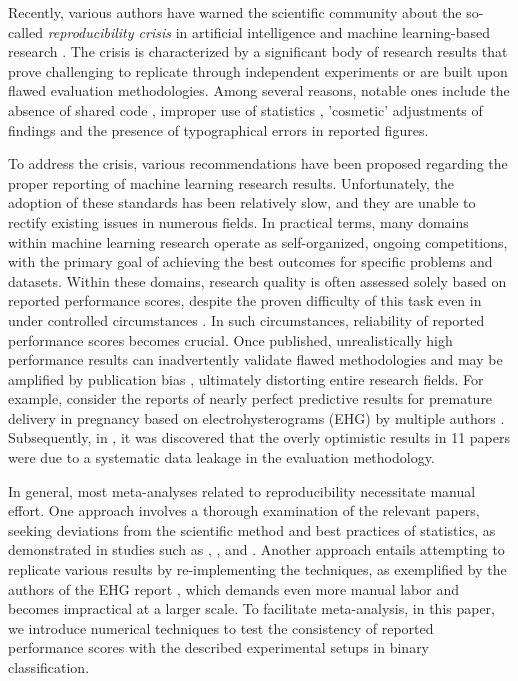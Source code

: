 \documentclass[5p, final]{elsarticle}
\begin{document}
Recently, various authors have warned the scientific community about the so-called \emph{reproducibility crisis} in artificial intelligence and machine learning-based research \cite{leakage, reprcrisis, repr0, repr1}. The crisis is characterized by a significant body of research results that prove challenging to replicate through independent experiments or are built upon flawed evaluation methodologies. Among several reasons, notable ones include the absence of shared code \cite{leakage}, improper use of statistics \cite{leakage, staterrors}, 'cosmetic' adjustments of findings \cite{fabrication} and the presence of typographical errors in reported figures.

To address the crisis, various recommendations have been proposed \cite{repr0, repr2} regarding the proper reporting of machine learning research results. Unfortunately, the adoption of these standards has been relatively slow, and they are unable to rectify existing issues in numerous fields.
In practical terms, many domains within machine learning research operate as self-organized, ongoing competitions, with the primary goal of achieving the best outcomes for specific problems and datasets. Within these domains, research quality is often assessed solely based on reported performance scores, despite the proven difficulty of this task even in under controlled circumstances \cite{ranking}. In such circumstances, reliability of reported performance scores becomes crucial. Once published, unrealistically high performance results can inadvertently validate flawed methodologies and may be amplified by publication bias \cite{publicationbias}, ultimately distorting entire research fields.
For example, consider the reports of nearly perfect predictive results for premature delivery in pregnancy based on electrohysterograms (EHG) by multiple authors \cite{ehgreview}. Subsequently, in \cite{ehg}, it was discovered that the overly optimistic results in 11 papers were due to a systematic data leakage in the evaluation methodology.

In general, most meta-analyses \cite{metaresearch} related to reproducibility necessitate manual effort. One approach involves a thorough examination of the relevant papers, seeking deviations from the scientific method and best practices of statistics, as demonstrated in studies such as \cite{psychiatry}, \cite{csecurity}, and \cite{satellite}. Another approach entails attempting to replicate various results by re-implementing the techniques, as exemplified by the authors of the EHG report \cite{ehg}, which demands even more manual labor and becomes impractical at a larger scale.
To facilitate meta-analysis, in this paper, we introduce numerical techniques to test the consistency of reported performance scores with the described experimental setups in binary classification.
\end{document}
